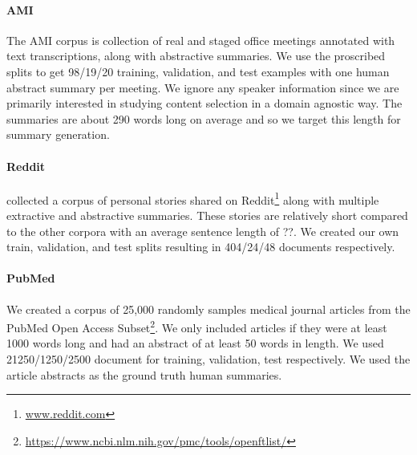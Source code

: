 \paragraph{AMI}{The AMI corpus \cite{carletta2005ami} 
is collection of real and staged office meetings
annotated with text transcriptions, along with abstractive
summaries. We use the proscribed splits to get 98/19/20 training, validation,
and test examples with one human abstract summary per meeting. 
We ignore any speaker information since we are primarily
interested in studying content selection in a domain agnostic way.
The summaries are about 290 words long on average and so we target this length
for summary generation. 
}

\paragraph{Reddit}{\citet{ouyang2017crowd} collected a corpus of personal 
    stories shared
 on Reddit\footnote{\url{www.reddit.com}} along with multiple extractive 
 and abstractive summaries. These stories are relatively short compared
 to the other corpora with an average sentence length of ??. 
 We created our own train, validation, and test splits resulting in 
404/24/48 documents respectively. 
}

\paragraph{PubMed}{We created a corpus of 25,000 randomly samples 
    medical journal articles from the PubMed Open Access 
    Subset\footnote{\url{https://www.ncbi.nlm.nih.gov/pmc/tools/openftlist/}}.
    We only included articles if they were at least 1000 words long and 
    had an abstract of at least 50 words in length.
    We used 21250/1250/2500 document for training, validation, test 
    respectively. 
We used the article abstracts as the ground truth human summaries.}



